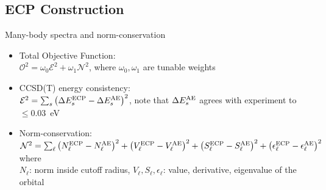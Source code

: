 \subsection{ECP Construction}
\begin{frame}
    {\color{ForestGreen}Many-body spectra and norm-conservation}
    \begin{itemize}
        \item Total Objective Function: \\
            $ \mathcal{O}^2 = \omega_0 \mathcal{E}^2 + \omega_1 \mathcal{N}^2 $, where $\omega_0,\omega_1$ are tunable weights\\
        \item CCSD(T) energy consistency:\\
            $\mathcal{E}^2 = \sum_s \left( \Delta E_s^{\rm ECP } -\Delta E_s^{\rm AE} \right)^2$, note that $\Delta E_s^{\rm AE}$ agrees with experiment to $\le 0.03$~eV
        \item Norm-conservation: \\
        $\mathcal{N}^2 = \sum_\ell\left( N_\ell^{\rm ECP}-N_\ell^{\rm AE} \right)^2 + \left(V_\ell^{\rm ECP} - V_\ell^{\rm AE}\right)^2 + \left(S_\ell^{\rm ECP}-S_\ell^{\rm AE}\right)^2 + \left( \epsilon_\ell^{\rm ECP} - \epsilon_\ell^{\rm AE} \right)^2$ where \\
        $N_\ell$: norm inside cutoff radius, $V_\ell, S_\ell, \epsilon_\ell$: value, derivative, eigenvalue of the orbital
    \end{itemize}
\end{frame}


